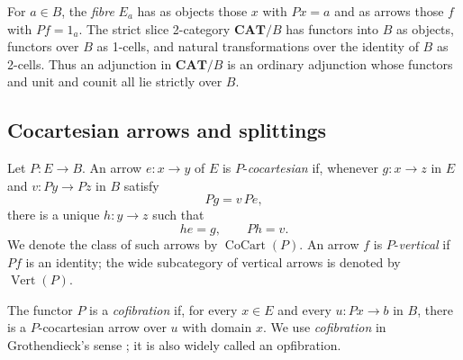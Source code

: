 \documentclass[11pt]{article}
\theoremstyle{plain}
\theoremstyle{definition}
\theoremstyle{remark}
\newcommand{\CAT}{\mathbf{CAT}}
\newcommand{\CoCart}{\operatorname{CoCart}}
\newcommand{\Vrt}{\operatorname{Vert}}
\numberwithin{equation}{section}
\begin{document}
For $a\in B$, the \emph{fibre} $E_a$ has as objects those $x$ with
$Px=a$ and as arrows those $f$ with $Pf=1_a$.  The strict slice
2-category $\CAT/B$ has functors into $B$ as objects, functors over
$B$ as 1-cells, and natural transformations over the identity of $B$
as 2-cells.  Thus an adjunction in $\CAT/B$ is an ordinary adjunction
whose functors and unit and counit all lie strictly over $B$.

\subsection{Cocartesian arrows and splittings}

Let $P\colon E\to B$.  An arrow $e\colon x\to y$ of $E$ is
$P$-\emph{cocartesian} if, whenever $g\colon x\to z$ in $E$ and
$v\colon Py\to Pz$ in $B$ satisfy
\begin{equation*}
Pg=v\,Pe,
\end{equation*}
there is a unique $h\colon y\to z$ such that
\begin{equation}
he=g,
  \qquad
  Ph=v.
  \label{eq:cocartesian-up}
\end{equation}
We denote the class of such arrows by $\CoCart(P)$.  An arrow $f$ is
$P$-\emph{vertical} if $Pf$ is an identity; the wide subcategory of
vertical arrows is denoted by $\Vrt(P)$.

The functor $P$ is a \emph{cofibration} if, for every $x\in E$ and
every $u\colon Px\to b$ in $B$, there is a $P$-cocartesian arrow over
$u$ with domain $x$.  We use \emph{cofibration} in Grothendieck's
sense \citep[Expos\'e~VI]{Grothendieck1971}; it is also widely called
an opfibration.
\end{document}
